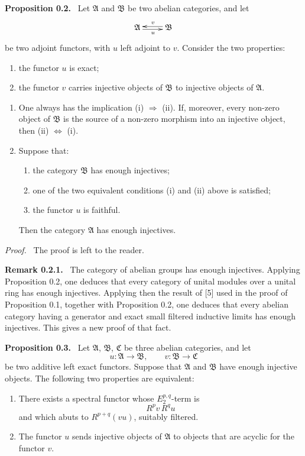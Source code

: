 \documentclass[11pt]{article}
\newcommand{\A}{\mathfrak{A}}
\newcommand{\B}{\mathfrak{B}}
\newcommand{\Ccat}{\mathfrak{C}}
\newenvironment{statement}[1]{\par\medskip\noindent\textbf{#1.}\ }{\par\medskip}
\newenvironment{remarktext}[1]{\par\medskip\noindent\textbf{#1.}\ }{\par\medskip}
\newenvironment{prooftext}{\par\noindent\emph{Proof.}\ }{\par\medskip}
\begin{document}
\begin{statement}{Proposition 0.2}
Let $\A$ and $\B$ be two abelian categories, and let
\[
\xymatrix{\A\ar@<-.4ex>[r]_{u}&\B\ar@<-.4ex>[l]_{v}}
\]
be two adjoint functors, with $u$ left adjoint to $v$. Consider the two properties:
\begin{enumerate}[label=(\roman*)]
\item the functor $u$ is exact;
\item the functor $v$ carries injective objects of $\B$ to injective objects of $\A$.
\end{enumerate}
\begin{enumerate}[label=\arabic*)]
\item One always has the implication (i) $\Rightarrow$ (ii). If, moreover, every non-zero object of $\B$ is the source of a non-zero morphism into an injective object, then (ii) $\Leftrightarrow$ (i).
\item Suppose that:
\begin{enumerate}[label=\alph*)]
\item the category $\B$ has enough injectives;
\item one of the two equivalent conditions (i) and (ii) above is satisfied;
\item the functor $u$ is faithful.
\end{enumerate}
Then the category $\A$ has enough injectives.
\end{enumerate}
\end{statement}

\begin{prooftext}
The proof is left to the reader.
\end{prooftext}

\begin{remarktext}{Remark 0.2.1}
The category of abelian groups has enough injectives. Applying Proposition 0.2, one deduces that every category of unital modules over a unital ring has enough injectives. Applying then the result of [5] used in the proof of Proposition 0.1, together with Proposition 0.2, one deduces that every abelian category having a generator and exact small filtered inductive limits has enough injectives. This gives a new proof of that fact.
\end{remarktext}

\begin{statement}{Proposition 0.3}
Let $\A$, $\B$, $\Ccat$ be three abelian categories, and let
\[
u:\A\longrightarrow \B,\qquad v:\B\longrightarrow \Ccat
\]
be two additive left exact functors. Suppose that $\A$ and $\B$ have enough injective objects. The following two properties are equivalent:
\begin{enumerate}[label=(\roman*)]
\item There exists a spectral functor whose $E_2^{p,q}$-term is
\[
R^p v\,R^q u
\]
and which abuts to $R^{p+q}(vu)$, suitably filtered.
\item The functor $u$ sends injective objects of $\A$ to objects that are acyclic for the functor $v$.
\end{enumerate}
\end{statement}
\end{document}
